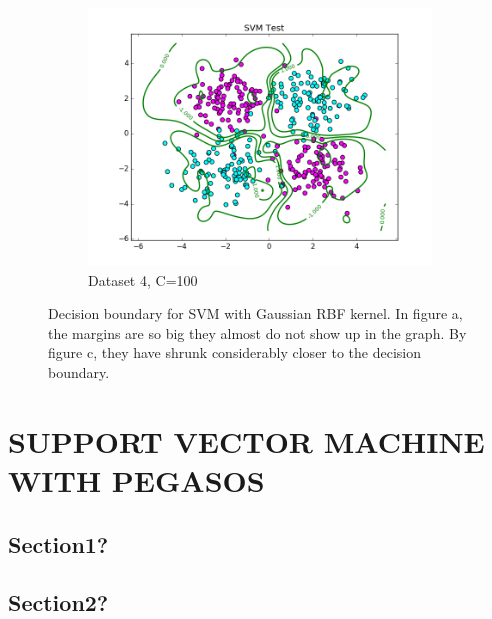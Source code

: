 \documentclass[10pt,twoside]{article}
\begin{document}
\begin{figure}[h]
\begin{subfigure}[b]{0.33\textwidth}
                \centering
                \includegraphics[width=\linewidth]{Figures/P2/RBF_data4_test_g1C100.png}
                \caption{Dataset 4, C=100}
        \end{subfigure}%
        \caption{Decision boundary for SVM with Gaussian RBF kernel. In figure a, the margins are so big they almost do not show up in the graph. By figure c, they have shrunk considerably closer to the decision boundary.}
\end{figure}




\section{\uppercase{Support Vector Machine with Pegasos}}

\subsection{Section1?}


\subsection{Section2?}


\end{document}
